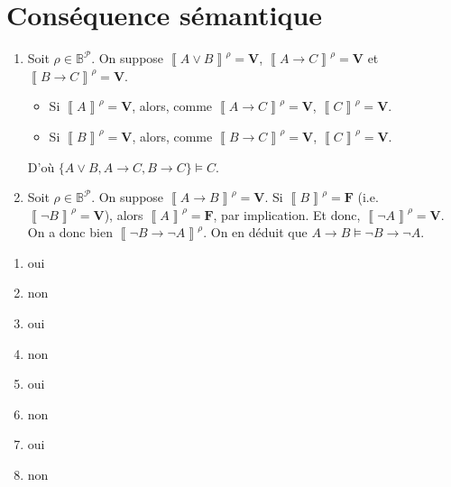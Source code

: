 \section{Conséquence sémantique}

\begin{enumerate}
	\item Soit $\rho \in \mathds{B}^{\mathcal{P}}$. On suppose $\left\llbracket A \lor B \right\rrbracket^\rho = \mathbf{V}$, $\left\llbracket A \to C \right\rrbracket^\rho = \mathbf{V}$\/ et $\left\llbracket B \to C \right\rrbracket^\rho = \mathbf{V}$.
		\begin{itemize}
			\item Si $\left\llbracket A \right\rrbracket^\rho = \mathbf{V}$, alors, comme $\left\llbracket A \to C \right\rrbracket^\rho = \mathbf{V}$, $\left\llbracket C \right\rrbracket^\rho = \mathbf{V}$.
			\item Si $\left\llbracket B \right\rrbracket^\rho = \mathbf{V}$, alors, comme $\left\llbracket B \to C \right\rrbracket^\rho = \mathbf{V}$, $\left\llbracket C \right\rrbracket^\rho = \mathbf{V}$.
		\end{itemize}
		D'où $\{A \lor B, A \to C, B \to C\} \models C$.
	\item Soit $\rho \in \mathds{B}^{\mathcal{P}}$. On suppose $\left\llbracket A \to B \right\rrbracket^\rho = \mathbf{V}$. Si $\left\llbracket B \right\rrbracket^\rho = \mathbf{F}$ (i.e.\ $\left\llbracket \lnot B \right\rrbracket^\rho = \mathbf{V}$), alors $\left\llbracket A \right\rrbracket^\rho = \mathbf{F}$, par implication. Et donc, $\left\llbracket \lnot A \right\rrbracket^\rho = \mathbf{V}$. On a donc bien $\left\llbracket \lnot B \to \lnot A \right\rrbracket^\rho$. On en déduit que $A \to B \models \lnot B \to \lnot A$.
\end{enumerate}
\vspace{-5mm}
\begin{multicols}{4}
	\begin{enumerate}
		\item[3.] oui
		\item[4.] non
		\item[5.] oui
		\item[6.] non
		\item[7.] oui
		\item[8.] non
		\item[9.] oui
		\item[10.] non
	\end{enumerate}
\end{multicols}

